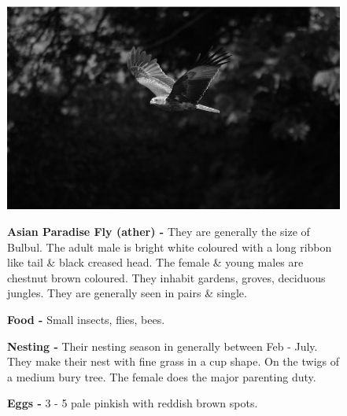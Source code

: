\begin{figure}[H]
\begin{center}
\includegraphics{figure/Land_birds/01_pariah_kite/pariah-kite.eps}
\end{center}
\medskip
\noindent
{\bf Asian Paradise Fly (ather) -} They are generally the size of Bulbul. The adult male is bright white coloured with a long ribbon like tail \& black creased head. The female \& young males are chestnut brown coloured. They inhabit gardens, groves, deciduous jungles. They are generally seen in pairs \& single. 

\medskip
{\bf Food -} Small insects, flies, bees.

{\bf Nesting -} Their nesting season in generally between Feb - July. They make their nest with fine grass in a cup shape. On the twigs of a medium bury tree. The female does the major parenting duty.

{\bf Eggs -} 3 - 5 pale pinkish with reddish brown spots. 
\end{figure}

\vfill\eject

~\phantom{a}
\vfill

